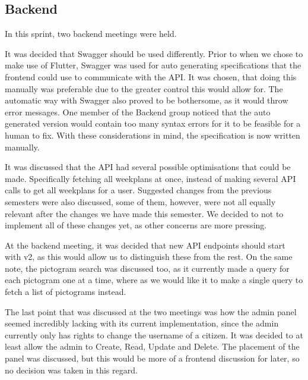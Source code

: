 \subsection{Backend}
In this sprint, two backend meetings were held.

It was decided that Swagger should be used differently.
Prior to when we chose to make use of Flutter, Swagger was used for auto generating specifications that the frontend could use to communicate with the API.
It was chosen, that doing this manually was preferable due to the greater control this would allow for.
The automatic way with Swagger also proved to be bothersome, as it would throw error messages.
One member of the Backend group noticed that the auto generated version would contain too many syntax errors for it to be feasible for a human to fix.
With these considerations in mind, the specification is now written manually.

It was discussed that the API had several possible optimisations that could be made.
Specifically fetching all weekplans at once, instead of making several API calls to get all weekplans for a user.
Suggested changes from the previous semesters were also discussed, some of them, however, were not all equally relevant after the changes we have made this semester.
We decided to not to implement all of these changes yet, as other concerns are more pressing.

At the backend meeting, it was decided that new API endpoints should start with v2, as this would allow us to distinguish these from the rest.
On the same note, the pictogram search was discussed too, as it currently made a query for each pictogram one at a time, where as we would like it to make a single query to fetch a list of pictograms instead.

The last point that was discussed at the two meetings was how the admin panel seemed incredibly lacking with its current implementation, since the admin currently only has rights to change the username of a citizen. 
It was decided to at least allow the admin to Create, Read, Update and Delete. 
The placement of the panel was discussed, but this would be more of a frontend discussion for later, so no decision was taken in this regard.
